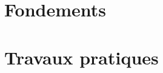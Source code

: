 \documentclass[11pt,a4paper,twoside,openright]{book}
\begin{document}
\frontmatter






\cleardoublepage
\tableofcontents
\cleardoublepage
\listoffigures
\listoftables

\mainmatter
\part{Fondements}



\part{Travaux pratiques}





\appendix




\backmatter

\printindex

\end{document}
